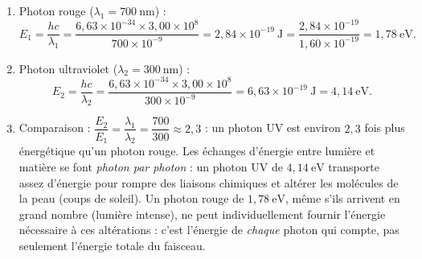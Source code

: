 \documentclass[11pt]{article}
\begin{document}
\begin{corrige}
\begin{enumerate}
\item Photon rouge ($\lambda_1 = 700\ \mathrm{nm}$) :
\[ E_1 = \frac{hc}{\lambda_1} = \frac{6,63\times10^{-34}\times3,00\times10^8}{700\times10^{-9}} = 2,84\times10^{-19}\ \mathrm{J} = \frac{2,84\times10^{-19}}{1,60\times10^{-19}} = 1,78\ \mathrm{eV}. \]
\item Photon ultraviolet ($\lambda_2 = 300\ \mathrm{nm}$) :
\[ E_2 = \frac{hc}{\lambda_2} = \frac{6,63\times10^{-34}\times3,00\times10^8}{300\times10^{-9}} = 6,63\times10^{-19}\ \mathrm{J} = 4,14\ \mathrm{eV}. \]
\item Comparaison : $\dfrac{E_2}{E_1} = \dfrac{\lambda_1}{\lambda_2} = \dfrac{700}{300} \approx 2,3$ : un photon UV est environ $2,3$ fois plus énergétique qu'un photon rouge. Les échanges d'énergie entre lumière et matière se font \emph{photon par photon} : un photon UV de $4,14\ \mathrm{eV}$ transporte assez d'énergie pour rompre des liaisons chimiques et altérer les molécules de la peau (coups de soleil). Un photon rouge de $1,78\ \mathrm{eV}$, même s'ils arrivent en grand nombre (lumière intense), ne peut individuellement fournir l'énergie nécessaire à ces altérations : c'est l'énergie de \emph{chaque} photon qui compte, pas seulement l'énergie totale du faisceau.
\end{enumerate}
\end{corrige}
\end{document}
